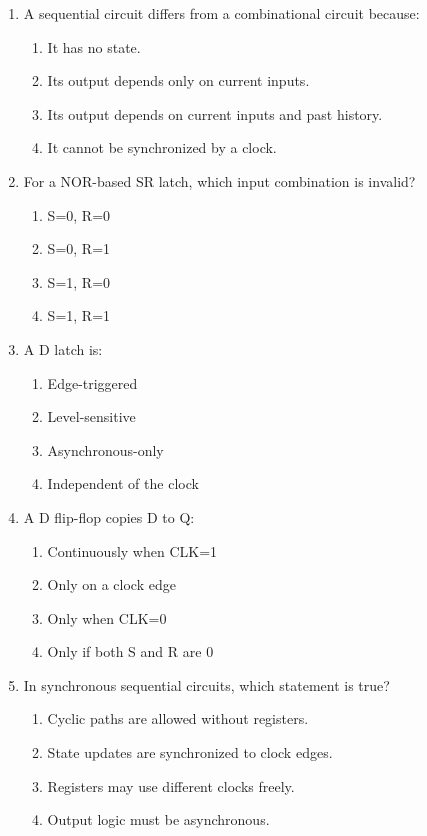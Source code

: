 \documentclass[11pt]{article}
\begin{document}
\begin{enumerate}[label=\textbf{A\arabic*.}]
  \item A sequential circuit differs from a combinational circuit because:
  \begin{enumerate}[label=(\Alph*)]
    \item It has no state.
    \item Its output depends only on current inputs.
    \item Its output depends on current inputs and past history.
    \item It cannot be synchronized by a clock.
  \end{enumerate}

  \item For a NOR-based SR latch, which input combination is invalid?
  \begin{enumerate}[label=(\Alph*)]
    \item S=0, R=0
    \item S=0, R=1
    \item S=1, R=0
    \item S=1, R=1
  \end{enumerate}

  \item A D latch is:
  \begin{enumerate}[label=(\Alph*)]
    \item Edge-triggered
    \item Level-sensitive
    \item Asynchronous-only
    \item Independent of the clock
  \end{enumerate}

  \item A D flip-flop copies D to Q:
  \begin{enumerate}[label=(\Alph*)]
    \item Continuously when CLK=1
    \item Only on a clock edge
    \item Only when CLK=0
    \item Only if both S and R are 0
  \end{enumerate}

  \item In synchronous sequential circuits, which statement is true?
  \begin{enumerate}[label=(\Alph*)]
    \item Cyclic paths are allowed without registers.
    \item State updates are synchronized to clock edges.
    \item Registers may use different clocks freely.
    \item Output logic must be asynchronous.
  \end{enumerate}


\end{enumerate}
\end{document}
